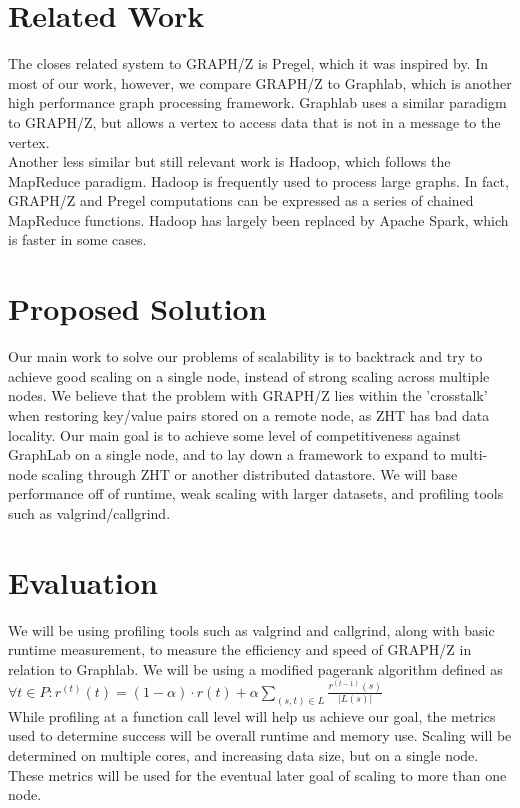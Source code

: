 \documentclass[10pt]{article}
\begin{document}
\begin{multicols}{2}
  \section{Related Work}
  The closes related system to GRAPH/Z is Pregel, which it was inspired by. In most of our work, however, we compare GRAPH/Z to Graphlab, which is another high performance graph processing framework. Graphlab uses a similar paradigm to GRAPH/Z, but allows a vertex to access data that is not in a message to the vertex. \cite{Gz:4} \\
  Another less similar but still relevant work is Hadoop, which follows the MapReduce paradigm. Hadoop is frequently used to process large graphs. In fact, GRAPH/Z and Pregel computations can be expressed as a series of chained MapReduce functions. \cite{Gz:4}  Hadoop has largely been replaced by Apache Spark, which is faster in some cases.    
  
  \section{Proposed Solution}
   Our main work to solve our problems of scalability is to backtrack and try to achieve good scaling on a single node, instead of strong scaling across multiple nodes. We believe that the problem with GRAPH/Z lies within the 'crosstalk' when restoring key/value pairs stored on a remote node, as ZHT has bad data locality. Our main goal is to achieve some level of competitiveness against GraphLab on a single node, and to lay down a framework to expand to multi-node scaling through ZHT or another distributed datastore. We will base performance off of runtime, weak scaling with larger datasets, and profiling tools such as valgrind/callgrind.
  \section{Evaluation}
  We will be using profiling tools such as valgrind and callgrind, along with basic runtime measurement, to measure the efficiency and speed of GRAPH/Z in relation to Graphlab. We will be using a modified pagerank algorithm defined as \\
  $\forall t \in P : r^{(t)}(t)  = (1-\alpha) \cdot r(t) + \alpha \sum_{(s,t) \in L} \frac{r^{(t-1)}(s)}{|L(s)|}$\\ 
  While profiling at a function call level will help us achieve our goal, the metrics used to determine success will be overall runtime and memory use. Scaling will be determined on multiple cores, and increasing data size, but on a single node.  These metrics will be used for the eventual later goal of scaling to more than one node.
\end{multicols}
\end{document}
